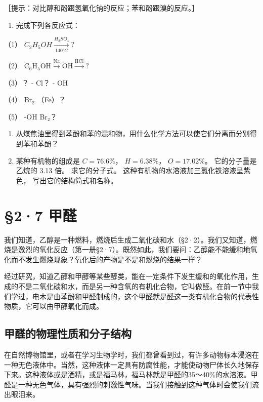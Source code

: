 ［提示：对比醇和酚跟氢氧化钠的反应；苯和酚跟溴的反应。］

\begin{enumerate}[start=8]
\item
  完成下列各反应式：
\end{enumerate}

（1） \(C_{2}H_{5}OH \xrightarrow[140^{\circ}C]{H_{2}SO_{4}} ?\)

（2）
\(\mathrm{C}_6\mathrm{H}_5\mathrm{OH}\xrightarrow{\mathrm{Na}}\mathrm{OH}\xrightarrow{\mathrm{HCl}}\mathrm{?}\)

（3）？ - Cl？ - OH

（4） \(\mathrm{Br}_{2}\) （Fe）？

（5） -OH Br₂？

\begin{enumerate}[start=9]
\item
  从煤焦油里得到苯酚和苯的混和物，用什么化学方法可以使它们分离而分别得到苯和苯酚？
\item
  某种有机物的组成是 \(C = 76.6\%\)， \(H = 6.38\%\)， \(O = 17.02\%\)。
  它的分子量是乙烷的 3.13 倍。 求它的分子式。
  这种有机物的水溶液加三氯化铁溶液呈紫色， 写出它的结构简式和名称。
\end{enumerate}

\section{§2·7 甲醛}

我们知道，乙醇是一种燃料，燃烧后生成二氧化碳和水（§2·2）。我们又知道，燃烧是激烈的氧化反应（第一册§2·7）。既然如此，我们要问：乙醇能不能缓和地氧化而不发生燃烧现象？氧化后的产物是不是和燃烧的结果一样？

经过研究，知道乙醇和甲醇等某些醇类，能在一定条件下发生缓和的氧化作用，生成的不是二氧化碳和水，而是另一种含氧的有机化合物，它叫做醛。在前一节中我们学过，电木是由苯酚和甲醛制成的，这个甲醛就是醛这一类有机化合物的代表性物质，它可以由甲醇氧化而成。

\subsection{甲醛的物理性质和分子结构}

在自然博物馆里，或者在学习生物学时，我们都曾看到过，有许多动物标本浸泡在一种无色液体中。当然，这种液体一定具有防腐性能，才能使动物尸体长久地保存下来。这种液体或是酒精，或是福马林，福马林就是甲醛的35～40\%的水溶液。甲醛是一种无色气体，具有强烈的刺激性气味。当我们接触到这种气体时会使我们流出眼泪来。

